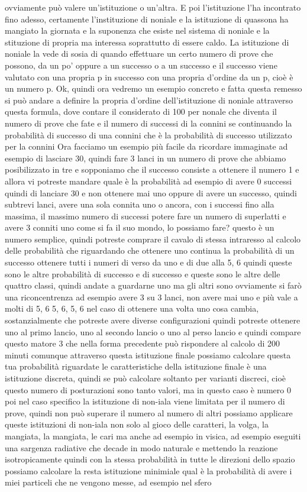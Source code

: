 ovviamente può valere un'istituzione o un'altra. E poi l'istituzione l'ha incontrato fino adesso, certamente l'instituzione di noniale e la istituzione di quassona ha mangiato la giornata e la suponenza che esiste nel sistema di noniale e la stituzione di propria ma interessa soprattutto di essere caldo. La istituzione di noniale la vede di sosia di quando effettuare un certo numero di prove che possono, da un po' oppure a un successo o a un successo e il successo viene valutato con una propria p in successo con una propria d'ordine da un p, cioè è un numero p. Ok, quindi ora vedremo un esempio concreto e fatta questa remesso si può andare a definire la propria d'ordine dell'istituzione di noniale attraverso questa formula, dove contare il considerato di 100 per nonale che diventa il numero di prove che fate e il numero di successi di la connini se continuando la probabilità di successo di una connini che è la probabilità di successo utilizzato per la connini Ora facciamo un esempio più facile da ricordare immaginate ad esempio di lasciare 30, quindi fare 3 lanci in un numero di prove che abbiamo posibilizzato in tre e sopponiamo che il successo consiste a ottenere il numero 1 e allora vi potreste mandare quale è la probabilità ad esempio di avere 0 successi quindi di lanciare 30 e non ottenere mai uno oppure di avere un successo, quindi subtrevi lanci, avere una sola connita uno o ancora, con i successi fino alla massima, il massimo numero di successi potere fare un numero di superlatti e avere 3 conniti uno come si fa il suo mondo, lo possiamo fare? questo è un numero semplice, quindi potreste comprare il cavalo di stessa intraresso al calcolo delle probabilità che riguardando che ottenere uno continua la probabilità di un successo ottenere tutti i numeri di verso da uno e di due alla 5, 6 quindi queste sono le altre probabilità di successo e di successo e queste sono le altre delle quattro classi, quindi andate a guardarne uno ma gli altri sono ovviamente si farò una riconcentrenza ad esempio avere 3 su 3 lanci, non avere mai uno e più vale a molti di 5, 6 5, 6, 5, 6 nel caso di ottenere una volta uno cosa cambia, sostanzialmente che potreste avere diverse configurazioni quindi potreste ottenere uno al primo lancio, uno al secondo lancio o uno al perso lancio e quindi compare questo matore 3 che nella forma precedente può rispondere al calcolo di 200 minuti comunque attraverso questa istituzione finale possiamo calcolare questa tua probabilità riguardate le caratteristiche della istituzione finale è una istituzione discreta, quindi se può calcolare soltanto per varianti discreci, cioè questo numero di posturazioni sono tanto valori, ma in questo caso è numero 0 poi nel caso specifico la istituzione di non-iala viene limitata per il numero di prove, quindi non può superare il numero al numero di altri possiamo applicare queste istituzioni di non-iala non solo al gioco delle caratteri, la volga, la mangiata, la mangiata, le cari ma anche ad esempio in visica, ad esempio eseguiti una sargenza radiative che decade in modo naturale e mettendo la reazione isotropicamente quindi con la stessa probabilità in tutte le direzioni dello spazio possiamo calcolare la resta istituzione minimiale qual è la probabilità di avere i miei particeli che ne vengono messe, ad esempio nel sfero 